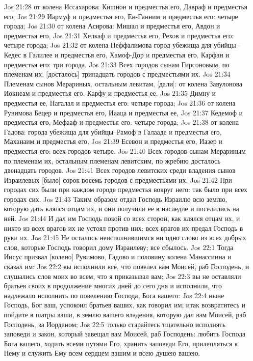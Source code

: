 Jos 21:28  от колена Иссахарова: Кишион и предместья его, Давраф и предместья его,
Jos 21:29  Иармуф и предместья его, Ен-Ганним и предместья его: четыре города;
Jos 21:30  от колена Асирова: Мишал и предместья его, Авдон и предместья его,
Jos 21:31  Хелкаф и предместья его, Рехов и предместья его: четыре города;
Jos 21:32  от колена Неффалимова город убежища для убийцы--Кедес в Галилее и предместья его, Хамоф-Дор и предместья его, Карфан и предместья его: три города.
Jos 21:33  Всех городов сынам Гирсоновым, по племенам их, [досталось] тринадцать городов с предместьями их.
Jos 21:34  Племенам сынов Мерариных, остальным левитам, [дали]: от колена Завулонова Иокнеам и предместья его, Карфу и предместья ее,
Jos 21:35  Димну и предместья ее, Нагалал и предместья его: четыре города;
Jos 21:36  от колена Рувимова Бецер и предместья его, Иааца и предместья ее,
Jos 21:37  Кедемоф и предместья его, Мефааф и предместья его: четыре города;
Jos 21:38  от колена Гадова: города убежища для убийцы--Рамоф в Галааде и предместья его, Маханаим и предместья его,
Jos 21:39  Есевон и предместья его, Иазер и предместья его: всех городов четыре.
Jos 21:40  Всех городов сынам Мерариным по племенам их, остальным племенам левитским, по жребию досталось двенадцать городов.
Jos 21:41  Всех городов левитских среди владения сынов Израилевых [было] сорок восемь городов с предместьями их.
Jos 21:42  При городах сих были при каждом городе предместья вокруг него: так было при всех городах сих.
Jos 21:43  Таким образом отдал Господь Израилю всю землю, которую дать клялся отцам их, и они получили ее в наследие и поселились на ней.
Jos 21:44  И дал им Господь покой со всех сторон, как клялся отцам их, и никто из всех врагов их не устоял против них; всех врагов их предал Господь в руки их.
Jos 21:45  Не осталось неисполнившимся ни одно слово из всех добрых слов, которые Господь говорил дому Израилеву; все сбылось.
Jos 22:1  Тогда Иисус призвал [колено] Рувимово, Гадово и половину колена Манассиина и сказал им:
Jos 22:2  вы исполнили все, что повелел вам Моисей, раб Господень, и слушались слов моих во всем, что я приказывал вам;
Jos 22:3  вы не оставляли братьев своих в продолжение многих дней до сего дня и исполнили, что надлежало исполнить по повелению Господа, Бога вашего:
Jos 22:4  ныне Господь, Бог ваш, успокоил братьев ваших, как говорил им; итак возвратитесь и пойдите в шатры ваши, в землю вашего владения, которую дал вам Моисей, раб Господень, за Иорданом;
Jos 22:5  только старайтесь тщательно исполнять заповеди и закон, который завещал вам Моисей, раб Господень: любить Господа Бога вашего, ходить всеми путями Его, хранить заповеди Его, прилепляться к Нему и служить Ему всем сердцем вашим и всею душею вашею.

